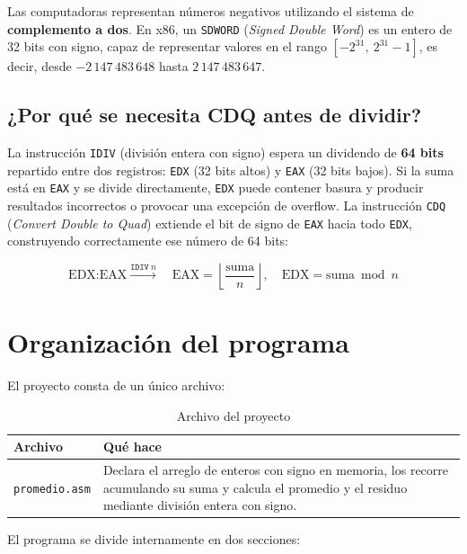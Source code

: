 \documentclass[12pt, letterpaper]{article}
\begin{document}
Las computadoras representan números negativos utilizando el sistema de \textbf{complemento a dos}. En x86, un \texttt{SDWORD} (\textit{Signed Double Word}) es un entero de 32 bits con signo, capaz de representar valores en el rango $[-2^{31},\ 2^{31}-1]$, es decir, desde $-2\,147\,483\,648$ hasta $2\,147\,483\,647$.

\subsection*{¿Por qué se necesita CDQ antes de dividir?}

La instrucción \texttt{IDIV} (división entera con signo) espera un dividendo de \textbf{64 bits} repartido entre dos registros: \texttt{EDX} (32 bits altos) y \texttt{EAX} (32 bits bajos). Si la suma está en \texttt{EAX} y se divide directamente, \texttt{EDX} puede contener basura y producir resultados incorrectos o provocar una excepción de overflow. La instrucción \texttt{CDQ} (\textit{Convert Double to Quad}) extiende el bit de signo de \texttt{EAX} hacia todo \texttt{EDX}, construyendo correctamente ese número de 64 bits:

\begin{equation}
    \text{EDX:EAX} \xrightarrow{\texttt{IDIV}\ n} \quad \text{EAX} = \left\lfloor \frac{\text{suma}}{n} \right\rfloor, \quad \text{EDX} = \text{suma} \bmod n
\end{equation}

\section{Organización del programa}

El proyecto consta de un único archivo:

\begin{table}[H]
    \centering
    \begin{tabular}{@{}lp{9cm}@{}}
        \toprule
        \textbf{Archivo} & \textbf{Qué hace} \\
        \midrule
        \texttt{promedio.asm} & Declara el arreglo de enteros con signo en memoria, los recorre acumulando su suma y calcula el promedio y el residuo mediante división entera con signo. \\
        \bottomrule
    \end{tabular}
    \caption{Archivo del proyecto}
\end{table}

El programa se divide internamente en dos secciones:
\end{document}
